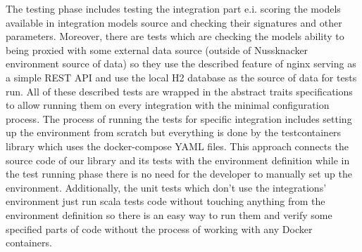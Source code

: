 The testing phase includes testing the integration part e.i. scoring the models available in integration
models source and checking their signatures and other parameters. Moreover, there are tests which are
checking the models ability to being proxied with some external data source (outside of Nussknacker
environment source of data) so they use the described feature of nginx serving as a simple REST API
and use the local H2 database as the source of data for tests run. All of these described tests are
wrapped in the abstract traits specifications to allow running them on every integration with the minimal
configuration process. The process of running the tests for specific integration includes setting up the
environment from scratch but everything is done by the testcontainers library which uses the docker-compose
YAML files. This approach connects the source code of our library and its tests with the environment
definition while in the test running phase there is no need for the developer to manually set up the
environment. Additionally, the unit tests which don’t use the integrations’ environment just run scala
tests code without touching anything from the environment definition so there is an easy way to run them
and verify some specified parts of code without the process of working with any Docker containers.

